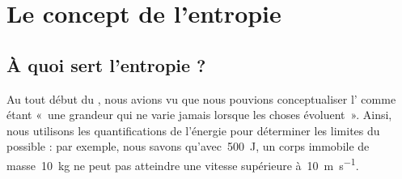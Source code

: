 \section{Le concept de l’entropie}

	\subsection{À quoi sert l’entropie ?}
	
		Au tout début du \coursun, nous avions vu que nous pouvions conceptualiser l’ comme étant «~une grandeur qui ne varie jamais lorsque les choses évoluent~». Ainsi, nous utilisons les quantifications de l’énergie pour déterminer les limites du possible : par exemple, nous savons qu’avec~\SI{500}{\joule}, un corps immobile de masse~\SI{10}{\kilogram} ne peut pas atteindre une vitesse supérieure à~\SI{10}{\metre\per\second}.
	
